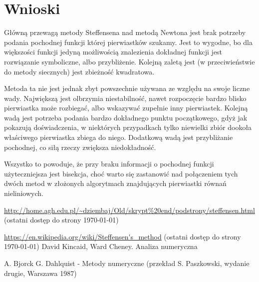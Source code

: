 \documentclass{article}
\begin{document}
\section{Wnioski}
Główną przewagą metody Steffensena nad metodą Newtona jest brak potrzeby podania pochodnej funkcji której pierwiastków szukamy. Jest to wygodne, bo dla większości funkcji jedyną możliwością znalezienia dokładnej funkcji jest rozwiązanie symboliczne, albo przybliżenie.
Kolejną zaletą jest (w przeciwieństwie do metody siecznych) jest zbieżność kwadratowa.

Metoda ta nie jest jednak zbyt powszechnie używana ze względu na swoje liczne wady. Największą jest olbrzymia niestabilność, nawet rozpoczęcie bardzo blisko pierwiastka może rozbiegać, albo wskazywać zupełnie inny pierwiastek. Kolejną wadą jest potrzeba podania bardzo dokładnego punktu początkowego, gdyż jak pokazują doświadczenia, w niektórych przypadkach tylko niewielki zbiór dookoła właściwego pierwiastka zbiega do niego. Dodatkową wadą jest przybliżanie pochodnej, co siłą rzeczy zwiększa niedokładność.

Wszystko to powoduje, że przy braku informacji o pochodnej funkcji użyteczniejsza jest bisekcja, choć warto się zastanowić nad połączeniem tych dwóch metod w złożonych algorytmach znajdujących pierwiastki równań nieliniowych.


\begin{thebibliography}{9}
	\itemsep2pt
	 \url{http://home.agh.edu.pl/~dziembaj/Old/skrypt%20end/podstrony/steffensen.html}
	(ostatni dostęp do strony \today)
	
	 \url{https://en.wikipedia.org/wiki/Steffensen's_method}
	(ostatni dostęp do strony \today)
     David Kincaid, Ward Cheney. Analiza numeryczna 

    A. Bjorck G. Dahlquist - Metody numeryczne (przekład S. Paszkowski, wydanie drugie, Warszawa 1987)
    
		
\end{thebibliography}
\end{document}
